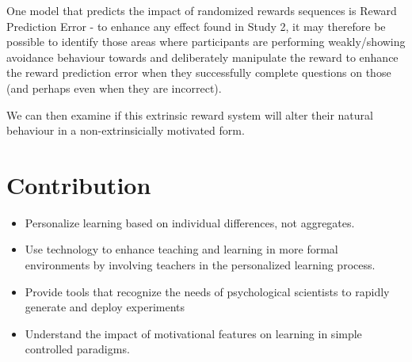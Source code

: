 \documentclass[12pt,a4paper,titlepage]{scrreprt}
\begin{document}
One model that predicts the impact of randomized rewards sequences is Reward Prediction Error - to enhance any effect found in Study 2, it may therefore be possible to identify those areas where participants are performing weakly/showing avoidance behaviour towards and deliberately manipulate the reward to enhance the reward prediction error when they successfully complete questions on those (and perhaps even when they are incorrect).

We can then examine if this extrinsic reward system will alter their natural behaviour in a non-extrinsicially motivated form.

\chapter{Contribution}
\begin{itemize}
\item Personalize learning based on individual differences, not aggregates.
\item Use technology to enhance teaching and learning in more formal environments by involving teachers in the personalized learning process.
\item Provide tools that recognize the needs of psychological scientists to rapidly generate and deploy experiments
\item Understand the impact of motivational features on learning in simple controlled paradigms.
\end{itemize}
\printbibliography
\end{document}

